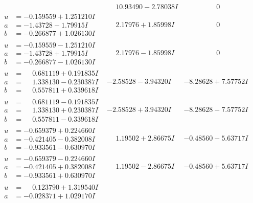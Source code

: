 \documentclass[1p]{elsarticle_modified}
\theoremstyle{definition}
\begin{document}
$$\begin{array}{c|c|c}
 & \phantom{-}10.93490 - 2.78038 I & \phantom{-0.000000 } 0 \\ \hline\begin{aligned}
u &= -0.159559 + 1.251210 I \\
a &= -1.43728 - 1.79915 I \\
b &= -0.266877 + 1.026130 I\end{aligned}
 & \phantom{-}2.17976 + 1.85998 I & \phantom{-0.000000 } 0 \\ \hline\begin{aligned}
u &= -0.159559 - 1.251210 I \\
a &= -1.43728 + 1.79915 I \\
b &= -0.266877 - 1.026130 I\end{aligned}
 & \phantom{-}2.17976 - 1.85998 I & \phantom{-0.000000 } 0 \\ \hline\begin{aligned}
u &= \phantom{-}0.681119 + 0.191835 I \\
a &= \phantom{-}1.338130 - 0.230387 I \\
b &= \phantom{-}0.557811 + 0.339618 I\end{aligned}
 & -2.58528 - 3.94320 I & -8.28628 + 7.57752 I \\ \hline\begin{aligned}
u &= \phantom{-}0.681119 - 0.191835 I \\
a &= \phantom{-}1.338130 + 0.230387 I \\
b &= \phantom{-}0.557811 - 0.339618 I\end{aligned}
 & -2.58528 + 3.94320 I & -8.28628 - 7.57752 I \\ \hline\begin{aligned}
u &= -0.659379 + 0.224660 I \\
a &= -0.421405 - 0.382008 I \\
b &= -0.933561 - 0.630970 I\end{aligned}
 & \phantom{-}1.19502 + 2.86675 I & -0.48560 - 5.63717 I \\ \hline\begin{aligned}
u &= -0.659379 - 0.224660 I \\
a &= -0.421405 + 0.382008 I \\
b &= -0.933561 + 0.630970 I\end{aligned}
 & \phantom{-}1.19502 - 2.86675 I & -0.48560 + 5.63717 I \\ \hline\begin{aligned}
u &= \phantom{-}0.123790 + 1.319540 I \\
a &= -0.028371 + 1.029170 I \\

\end{aligned}
\end{array}$$
\end{document}
